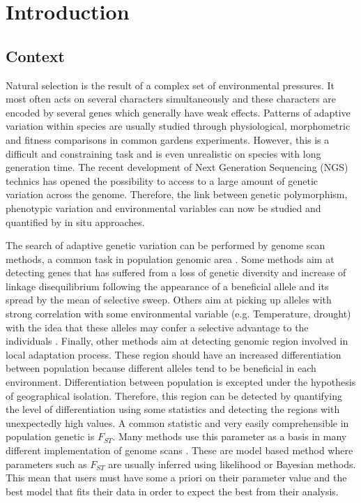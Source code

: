 \documentclass[a4paper,times,10pt,authoryear]{article}%
\begin{document}
\section{{Introduction}\label{sec:Intro}}

\subsection{Context}
Natural selection is the result of a complex set of environmental pressures. It most often acts on several characters simultaneously and these characters are encoded by several genes which generally have weak effects. Patterns of adaptive variation within species are usually studied through physiological, morphometric and fitness comparisons in common gardens experiments. However, this is a difficult and constraining task and is even unrealistic on species with long generation time. The recent development of Next Generation Sequencing (NGS) technics has opened the possibility to access to a large amount of genetic variation across the genome. Therefore, the link between genetic polymorphism, phenotypic variation and environmental variables can now be studied and quantified by in situ approaches.

The search of adaptive genetic variation can be performed by genome scan methods, a common task in population genomic area \citep{Foll2008,Frichot2013,Luu2016,Vatsiou2015}. Some methods aim at detecting  genes that has suffered from a loss of genetic diversity and increase of linkage disequilibrium following the appearance of a beneficial allele and its spread by the mean of selective sweep. Others aim at picking up alleles with strong correlation with some environmental variable (e.g. Temperature, drought) with the idea that these alleles may confer a selective advantage to the individuals  \citep{Coop2010,Frichot2013}. Finally, other methods aim at detecting genomic region involved in local adaptation process. These region should have an increased differentiation between population because different alleles tend to be beneficial in each environment. Differentiation between population is excepted under the hypothesis of geographical isolation. Therefore, this region can be detected by quantifying the level of differentiation using some statistics and detecting the regions with unexpectedly high values. A common statistic and very easily comprehensible in population genetic is $F_{ST}$. Many methods use this parameter as a basis in many different implementation of genome scans \citep{Bazin2010,DeVillemereuil2015,Foll2008}. These are model based method where parameters such as $F_{ST}$ are usually inferred using likelihood or Bayesian methods. This mean that users must have some a priori on their parameter value and the best model that fits their data in order to expect the best from their analysis.
\end{document}
